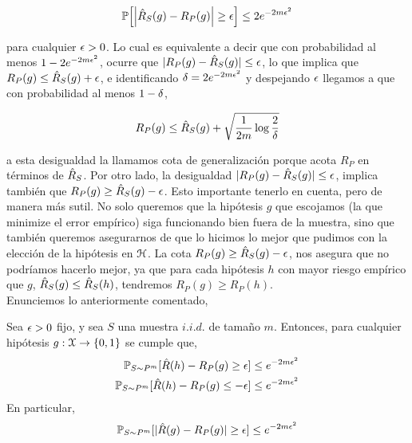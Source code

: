     \begin{equation}
        \mathbb{P} \Big[ \Big| \hat{R}_S(g) - R_{P}(g) \Big| \geq \epsilon \Big] \leq 2 e^{-2m\epsilon^2 }
    \end{equation}
    
    \noindent para cualquier $\epsilon > 0$. Lo cual es equivalente a decir que con probabilidad al menos $1 - 2 e^{-2m\epsilon^2 }$, ocurre que $|R_{P}(g) - \hat{R}_S(g)| \leq \epsilon$, lo que implica que $R_{P}(g) \leq \hat{R}_S(g) + \epsilon$, e identificando $\delta = 2e^{-2m\epsilon^2}$ y despejando $\epsilon$ llegamos a que con probabilidad al menos $1 - \delta$,
    
    \begin{equation}\label{eq:Generalization Bound}
        R_{P}(g) \leq \hat{R}_S(g) + \sqrt{\frac{1}{2m} \log{\frac{2}{\delta}}}
    \end{equation}
    
    \noindent a esta desigualdad la llamamos cota de generalización porque acota $R_{P}$ en términos de $\hat{R}_S$. Por otro lado, la desigualdad  $|R_{P}(g) - \hat{R}_S(g)| \leq \epsilon$, implica también que $R_{P}(g) \geq \hat{R}_S(g) - \epsilon$. Esto importante tenerlo en cuenta, pero de manera más sutil. No solo queremos que la hipótesis $g$ que escojamos (la que minimize el error empírico) siga funcionando bien fuera de la muestra, sino que también queremos asegurarnos de que lo hicimos lo mejor que pudimos con la elección de la hipótesis en $\mathcal{H}$. La cota $R_{P}(g) \geq \hat{R}_S(g) - \epsilon$, nos asegura que no podríamos hacerlo mejor, ya que para cada hipótesis $h$ con mayor riesgo empírico que $g$, $\hat{R}_S(g) \leq \hat{R}_S(h)$, tendremos $R_P(g) \geq R_P(h)$. \\
    
    Enunciemos lo anteriormente comentado,
    
    \begin{proposicion}
     Sea $\epsilon >0$ fijo, y sea $S$ una muestra $i.i.d.$ de tamaño $m$. Entonces, para cualquier hipótesis $g:\mathcal{X} \to \{0,1\}$ se cumple que,
     \begin{equation}
         \begin{aligned}
              \mathbb{P}_{S \sim P^m}[ \hat{R}(h) - R_P(g) \geq \epsilon ] & \leq e^{-2m\epsilon^2} \\
              \mathbb{P}_{S \sim P^m}[ \hat{R}(h) - R_P(g) \leq -\epsilon ] & \leq e^{-2m\epsilon^2}
         \end{aligned}
     \end{equation}
     En particular,
     \begin{equation}
         \mathbb{P}_{S \sim P^m}[ |\hat{R}(g) - R_P(g) | \geq \epsilon ]  \leq e^{-2m\epsilon^2}
     \end{equation}
    \end{proposicion}
    
